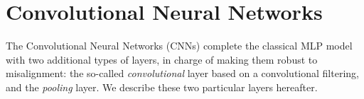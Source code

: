 



\section{Convolutional Neural Networks}\label{sec:CNN}

The Convolutional Neural Networks (CNNs) complete the classical  MLP model with two additional types of layers, in charge of making them robust to misalignment: the so-called {\em convolutional} layer based on a convolutional filtering, and the \emph{pooling} layer. We describe these two particular layers hereafter.


